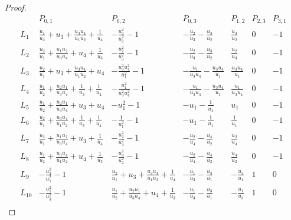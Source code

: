 \documentclass[10pt,a4paper]{amsart}
\begin{document}
\begin{proof}
\begin{table}[h]
    \begin{equation*}
    \begin{array}{c||c|c|c|c|c|c|}
             & P_{0,1}   & P_{0,2}    & P_{0,3}   & P_{1,2}   &  P_{2,3}   & P_{3,1}        \\
        \hline\hline 
        L_1  & \frac{u_1}{u_2}+u_3+\frac{u_3 u_4}{u_1 u_2}+\frac{1}{u_4}     & -\frac{u_3^2}{u_2^2}-1     & -\frac{u_2}{u_3}-\frac{u_3}{u_2}   & \frac{u_3}{u_2}  & 0   & -1           \\
        \hline
        L_2  &  \frac{u_2}{u_1}+\frac{u_1 u_2}{u_3 u_4}+u_4+\frac{1}{u_3}     & -\frac{u_2^2}{u_3^2}-1     & -\frac{u_2}{u_3}-\frac{u_3}{u_2}   & \frac{u_2}{u_3}  & 0   & -1           \\
        \hline
        L_3  & \frac{u_2}{u_1}+u_3+\frac{u_3 u_4}{u_1 u_2}+u_4     & -\frac{u_3^2 u_4^2}{u_1^2}-1  & -\frac{u_1}{u_3 u_4}-\frac{u_3 u_4}{u_1}  & \frac{u_3 u_4}{u_1}  & 0   & -1           \\
        \hline
        L_4  & \frac{u_1}{u_2}+\frac{u_2 u_1}{u_3 u_4}+\frac{1}{u_3}+\frac{1}{u_4}    &-\frac{u_1^2}{u_3^2 u_4^2}-1  & -\frac{u_1}{u_3 u_4}-\frac{u_3 u_4}{u_1}  & \frac{u_1}{u_3 u_4}  & 0   & -1           \\
        \hline
        L_5  & \frac{u_1}{u_2}+\frac{u_2 u_1}{u_3 u_4}+u_3+u_4    &-u_1^2-1  & -u_1-\frac{1}{u_1}  & u_1  & 0   & -1           \\
        \hline
        L_6  & \frac{u_2}{u_1}+\frac{u_3 u_4}{u_1 u_2}+\frac{1}{u_3}+\frac{1}{u_4}    &-\frac{1}{u_1^2}-1  & -u_1-\frac{1}{u_1}  & \frac{1}{u_1}  & 0   & -1           \\
        \hline
        L_7  & \frac{u_2}{u_1}+\frac{u_1 u_2}{u_3 u_4}+u_3+\frac{1}{u_4}    &-\frac{u_2^2}{u_4^2}-1  & -\frac{u_2}{u_4}-\frac{u_4}{u_2}  & \frac{u_2}{u_4}  & 0   & -1           \\
        \hline
        L_8  & \frac{u_1}{u_2}+\frac{u_3 u_4}{u_1 u_2}+u_4+\frac{1}{u_3}    &-\frac{u_4^2}{u_2^2}-1  & -\frac{u_2}{u_4}-\frac{u_4}{u_2}  & \frac{u_4}{u_2}  & 0   & -1           \\
        \hline\hline 
        L_9  & -\frac{u_3^2}{u_1^2}-1    &\frac{u_2}{u_1}+u_3+\frac{u_3 u_4}{u_1 u_2}+\frac{1}{u_4}  & -\frac{u_1}{u_3}-\frac{u_3}{u_1} & -\frac{u_3}{u_1}  & 1   & 0           \\
        \hline
        L_{10}  & -\frac{u_1^2}{u_3^2}-1 & \frac{u_1}{u_2}+\frac{u_2 u_1}{u_3 u_4}+u_4+\frac{1}{u_3} & -\frac{u_1}{u_3}-\frac{u_3}{u_1}  & -\frac{u_1}{u_3}  & 1   & 0           \\

\end{array}
\end{equation*}
\end{table}
\end{proof}
\end{document}
